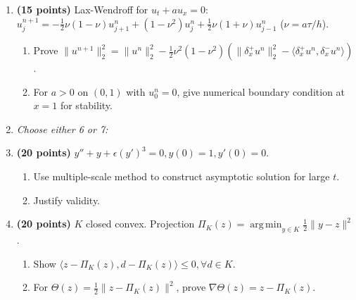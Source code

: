 \documentclass[11pt,a4paper]{article}
\DeclareMathOperator*{\argmin}{arg\,min}
\begin{document}
\begin{enumerate}[label=\textbf{\arabic*.}]
    \item \textbf{(15 points)} Lax-Wendroff for $u_t + a u_x = 0$: $u_j^{n+1} = -\frac{1}{2}\nu(1-\nu)u_{j+1}^n + (1-\nu^2)u_j^n + \frac{1}{2}\nu(1+\nu)u_{j-1}^n$ ($\nu = a\tau/h$).
    \begin{enumerate}[label=(\roman*)]
        \item Prove $\|u^{n+1}\|_2^2 = \|u^n\|_2^2 - \frac{1}{2}\nu^2(1-\nu^2) \left( \|\delta_x^+ u^n\|_2^2 - \langle \delta_x^+ u^n, \delta_x^- u^n \rangle \right)$.
        \item For $a > 0$ on $(0, 1)$ with $u_0^n = 0$, give numerical boundary condition at $x=1$ for stability.
    \end{enumerate}

    \item[] \textit{Choose either 6 or 7:}

    \item \textbf{(20 points)} $y'' + y + \epsilon (y')^3 = 0, y(0) = 1, y'(0) = 0$.
    \begin{enumerate}[label=(\roman*)]
        \item Use multiple-scale method to construct asymptotic solution for large $t$.
        \item Justify validity.
    \end{enumerate}

    \item \textbf{(20 points)} $K$ closed convex. Projection $\Pi_K(z) = \argmin_{y \in K} \frac{1}{2}\|y - z\|^2$.
    \begin{enumerate}[label=(\roman*)]
        \item Show $\langle z - \Pi_K(z), d - \Pi_K(z) \rangle \le 0, \forall d \in K$.
        \item For $\Theta(z) = \frac{1}{2}\|z - \Pi_K(z)\|^2$, prove $\nabla \Theta(z) = z - \Pi_K(z)$.
    \end{enumerate}
\end{enumerate}
\end{document}
